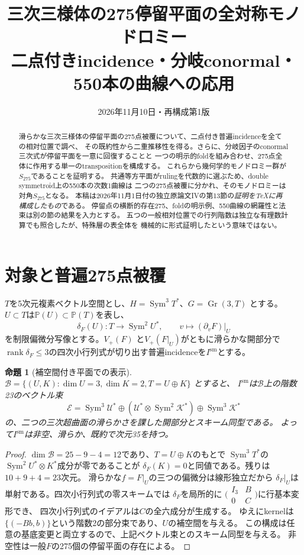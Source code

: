 \documentclass[11pt,a4paper]{ltjsarticle}
\title{三次三様体の275停留平面の全対称モノドロミー\\
\large 二点付きincidence・分岐conormal・550本の曲線への応用}
\author{}
\date{2026年11月10日・再構成第1版}
\newtheorem{proposition}[theorem]{命題}
\newcommand{\PP}{\mathbb P}
\newcommand{\Gr}{\operatorname{Gr}}
\newcommand{\Sym}{\operatorname{Sym}}
\newcommand{\rk}{\operatorname{rank}}
\begin{document}
\maketitle
\begin{abstract}
滑らかな三次三様体の停留平面の275点被覆について、二点付き普遍incidenceを全ての相対位置で調べ、
その既約性から二重推移性を得る。さらに、分岐因子のconormal三次式が停留平面を一意に回復することと
一つの明示的foldを組み合わせ、275点全体に作用する単一のtranspositionを構成する。
これらから幾何学的モノドロミー群が$S_{275}$であることを証明する。
共通等方平面がrulingを代数的に選ぶため、double symmetroid上の550本の次数1曲線は
二つの275点被覆に分かれ、そのモノドロミーは対角$S_{275}$となる。
本稿は2026年11月1日付の独立原論文IVの第13節の\emph{証明をTeXに再構成したもの}である。
停留点の横断的存在275、foldの明示例、550曲線の網羅性と法束は別の節の結果を入力とする。
五つの一般相対位置での行列階数は独立な有理数計算でも照合したが、特殊層の表全体を
機械的に形式証明したという意味ではない。\end{abstract}
\tableofcontents

\section{対象と普遍275点被覆}
$T$を5次元複素ベクトル空間とし、$H=\Sym^3T^*$、$G=\Gr(3,T)$ とする。
$U\subset T$は$\PP(U)\subset\PP(T)$を表し、
\[
 \delta_F(U):T\longrightarrow\Sym^2U^*,\qquad
 v\longmapsto(\partial_vF)|_U
\]
を制限偏微分写像とする。$V_+(F)$ と$V_+(F|_U)$がともに滑らかな開部分で
$\rk\delta_F\le3$の四次小行列式が切り出す普遍incidenceを$I^{\mathrm{sm}}$とする。

\begin{proposition}[補空間付き平面での表示]\label{prop:single}
$\mathcal B=\{(U,K):\dim U=3,\dim K=2,T=U\oplus K\}$ とすると、
$I^{\mathrm{sm}}$は$\mathcal B$上の階数23のベクトル束
\[
 \mathcal E=\Sym^3\mathcal U^*\oplus
 (\mathcal U^*\otimes\Sym^2\mathcal K^*)\oplus\Sym^3\mathcal K^*
\]
の、二つの三次超曲面の滑らかさを課した開部分とスキーム同型である。
よって$I^{\mathrm{sm}}$は非空、滑らか、既約で次元35を持つ。
\end{proposition}
\begin{proof}
$\dim\mathcal B=25-9-4=12$であり、$T=U\oplus K$のもとで
$\Sym^3T^*$の$\Sym^2U^*\otimes K^*$成分が零であることが
$\delta_F(K)=0$と同値である。残りは$10+9+4=23$次元。
滑らかな$f=F|_U$の三つの偏微分は線形独立だから
$\delta_F|_U$は単射である。四次小行列式の零スキームでは
$\delta_F$を局所的に
$\bigl(\begin{smallmatrix}I_3&B\\0&C\end{smallmatrix}\bigr)$に行基本変形でき、
四次小行列式のイデアルは$C$の全六成分が生成する。
ゆえにkernelは$\{(-Bb,b)\}$という階数2の部分束であり、$U$の補空間を与える。
この構成は任意の基底変更と両立するので、上記ベクトル束とのスキーム同型を与える。
非空性は一般$F$の275個の停留平面の存在による。\end{proof}
\end{document}
